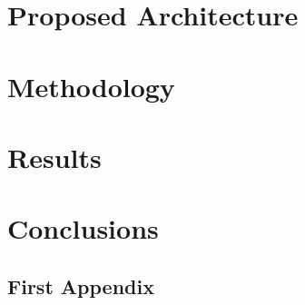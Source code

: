 \documentclass[pdftex]{pucthesis}	%
\begin{document}
\chapter[PROPOSED ARCHITECTURE]{Proposed Architecture} \label{arch}


\chapter[METHODOLOGY]{Methodology} \label{work}


\chapter[RESULTS]{Results} \label{work}


\chapter[CONCLUSIONS]{Conclusions}



\cleardoublepage
{} \label{references}

\renewcommand{\bibname}{REFERENCES}






\appendix %

\newpage
\section[First Appendix]{First Appendix}

\end{document}
